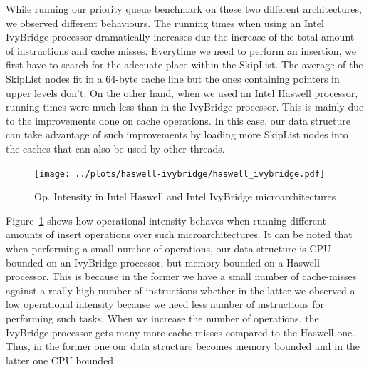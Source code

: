 While running our priority queue benchmark on these two different architectures, we observed different behaviours. The running times when using an Intel IvyBridge processor dramatically increases due the increase of the total amount of instructions and cache misses. Everytime we need to perform an insertion, we first have to search for the adecuate place within the SkipList. The average of the SkipList nodes fit in a 64-byte cache line but the ones containing pointers in upper levels don't. On the other hand, when we used an Intel Haswell processor, running times were much less than in the IvyBridge processor. This is mainly due to the improvements done on cache operations. In this case, our data structure can take advantage of such improvements by loading more SkipList nodes into the caches that can also be used by other threads.

\begin{figure}\centering
  	\texttt{[image: ../plots/haswell-ivybridge/haswell\_ivybridge.pdf]}
	\caption{Op. Intensity in Intel Haswell and Intel IvyBridge microarchitectures}
	\label{fig:haswell_ivybridge}
\end{figure}

Figure~\ref{fig:haswell_ivybridge} shows how operational intensity behaves when running different amounts of insert operations over such microarchitectures. It can be noted that when performing a small number of operations, our data structure is CPU bounded on an IvyBridge processor, but memory bounded on a Haswell processor. This is because in the former we have a small number of cache-misses against a really high number of instructions whether in the latter we observed a low operational intensity because we need less number of instructions for performing such tasks. When we increase the number of operations, the IvyBridge processor gets many more cache-misses compared to the Haswell one. Thus, in the former one our data structure becomes memory bounded and in the latter one CPU bounded.


